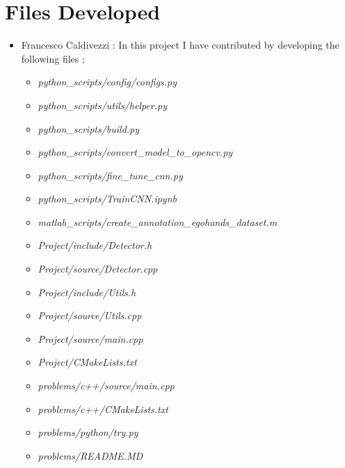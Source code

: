 \section{Files Developed}
    \begin{itemize}
        \item Francesco Caldivezzi : In this project I have contributed by developing the following files :
            \begin{itemize}
                \item \textit{python\_scripts/config/configs.py}
                \item \textit{python\_scripts/utils/helper.py}
                \item \textit{python\_scripts/build.py}
                \item \textit{python\_scripts/convert\_model\_to\_opencv.py}
                \item \textit{python\_scripts/fine\_tune\_cnn.py}
                \item \textit{python\_scripts/TrainCNN.ipynb}
                
                \item \textit{matlab\_scripts/create\_annotation\_egohands\_dataset.m}
                
                \item \textit{Project/include/Detector.h}
                \item \textit{Project/source/Detector.cpp}
                \item \textit{Project/include/Utils.h}
                \item \textit{Project/source/Utils.cpp}
                \item \textit{Project/source/main.cpp}
                \item \textit{Project/CMakeLists.txt}
                
                \item \textit{problems/c++/source/main.cpp}
                \item \textit{problems/c++/CMakeLists.txt}
                \item \textit{problems/python/try.py}
                \item \textit{problems/README.MD}
                

\end{itemize}
\end{itemize}
